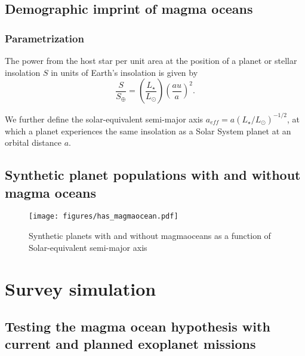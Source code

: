 \documentclass[twocolumn]{aastex631}
\begin{document}
\subsection{Demographic imprint of magma oceans}

\subsubsection{Parametrization}
\label{sec:mo_model}

\begin{note}
The power from the host star per unit area at the position of a planet or stellar insolation $S$ in units of Earth's insolation is given by
    \begin{equation}
        \frac{S}{S_\oplus} = \left(\frac{L_\star}{L_\odot}\right) \left(\frac{au}{a}\right)^2 .
    \end{equation}

We further define the solar-equivalent semi-major axis $a_{eff} = a (L_\star/L_\odot)^{-1/2}$, at which a planet experiences the same insolation as a Solar System planet at an orbital distance $a$.
\end{note}

\subsection{Synthetic planet populations with and without magma oceans}
\begin{figure*}
    \begin{centering}
        \texttt{[image: figures/has\_magmaocean.pdf]}
        \caption{Synthetic planets with and without magmaoceans as a function of Solar-equivalent semi-major axis}
        \label{fig:has_magmaocean}
    \end{centering}
\end{figure*}

\section{Survey simulation}

\subsection{Testing the magma ocean hypothesis with current and planned exoplanet missions}
\end{document}
